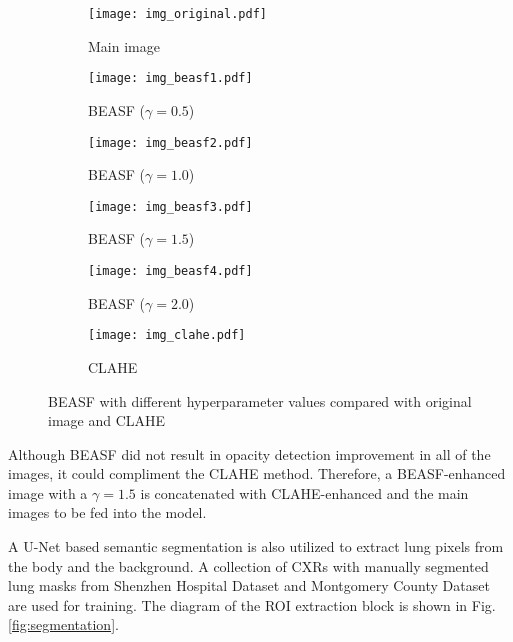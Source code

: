 \documentclass{article}
\begin{document}
\begin{figure}[H]
    \begin{subfigure}{0.3\linewidth}
        \centering
        \texttt{[image: img\_original.pdf]}
        \caption{Main image}
        \label{fig:img_original2}
    \end{subfigure}
    \hfill
    \begin{subfigure}{0.3\linewidth}
        \centering
        \texttt{[image: img\_beasf1.pdf]}
        \caption{BEASF (\(\gamma=0.5\))}
        \label{fig:img_beasf1}
    \end{subfigure}
    \hfill
    \begin{subfigure}{0.3\linewidth}
        \centering
        \texttt{[image: img\_beasf2.pdf]}
        \caption{BEASF (\(\gamma=1.0\))}
        \label{fig:img_beasf2}
    \end{subfigure}
    \hfill
    \begin{subfigure}{0.3\linewidth}
        \centering
        \texttt{[image: img\_beasf3.pdf]}
        \caption{BEASF (\(\gamma=1.5\))}
        \label{fig:img_beasf3}
    \end{subfigure}
    \hfill
    \begin{subfigure}{0.3\linewidth}
        \centering
        \texttt{[image: img\_beasf4.pdf]}
        \caption{BEASF (\(\gamma=2.0\))}
        \label{fig:img_beasf4}
    \end{subfigure}
    \hfill
    \begin{subfigure}{0.3\linewidth}
        \centering
        \texttt{[image: img\_clahe.pdf]}
        \caption{CLAHE}
        \label{fig:img_clahe2}
    \end{subfigure}
\caption{BEASF with different hyperparameter values compared with original image and CLAHE}
\label{fig:beasf_vs_clahe}
\end{figure}

\noindent Although BEASF did not result in opacity detection improvement in all of the images, it could compliment the CLAHE method. Therefore, a BEASF-enhanced image with a \(\gamma=1.5\) is concatenated with CLAHE-enhanced and the main images to be fed into the model.

A U-Net based semantic segmentation \cite{ronneberger2015u} is also utilized to extract lung pixels from the body and the background. A collection of CXRs with manually segmented lung masks from Shenzhen Hospital Dataset \cite{stirenko2018chest} and Montgomery County Dataset \cite{candemir2013lung} are used for training. The diagram of the ROI extraction block is shown in Fig. \ref{fig:segmentation}.
\end{document}
